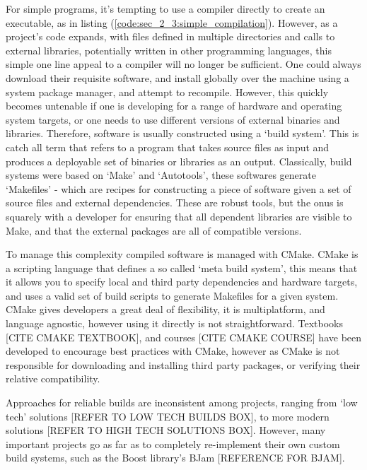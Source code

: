 For simple programs, it's tempting to use a compiler directly to create an executable, as in listing (\ref{code:sec_2_3:simple_compilation}). However, as a project's code expands, with files defined in multiple directories and calls to external libraries, potentially written in other programming languages, this simple one line appeal to a compiler will no longer be sufficient. One could always download their requisite software, and install globally over the machine using a system package manager, and attempt to recompile. However, this quickly becomes untenable if one is developing for a range of hardware and operating system targets, or one needs to use different versions of external binaries and libraries. Therefore, software is usually constructed using a `build system'. This is catch all term that refers to a program that takes source files as input and produces a deployable set of binaries or libraries as an output. Classically, build systems were based on `Make' and `Autotools', these softwares generate `Makefiles' - which are recipes for constructing a piece of software given a set of source files and external dependencies. These are robust tools, but the onus is squarely with a developer for ensuring that all dependent libraries are visible to Make, and that the external packages are all of compatible versions.

To manage this complexity compiled software is managed with CMake. CMake is a scripting language that defines a so called `meta build system', this means that it allows you to specify local and third party dependencies and hardware targets, and uses a valid set of build scripts to generate Makefiles for a given system. CMake gives developers a great deal of flexibility, it is multiplatform, and language agnostic, however using it directly is not straightforward. Textbooks [CITE CMAKE TEXTBOOK], and courses [CITE CMAKE COURSE] have been developed to encourage best practices with CMake, however as CMake is not responsible for downloading and installing third party packages, or verifying their relative compatibility.

Approaches for reliable builds are inconsistent among projects, ranging from `low tech' solutions [REFER TO LOW TECH BUILDS BOX], to more modern solutions [REFER TO HIGH TECH SOLUTIONS BOX]. However, many important projects go as far as to completely re-implement their own custom build systems, such as the Boost library's BJam [REFERENCE FOR BJAM].

